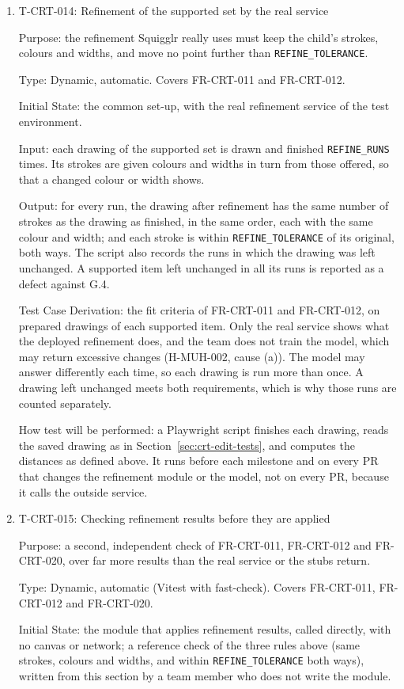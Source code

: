 \documentclass[12pt, titlepage]{article}
\newcommand{\testitem}[1]{\item #1\par\nopagebreak}
\begin{document}
\begin{enumerate}
\testitem{T-CRT-014: Refinement of the supported set by the real service}

Purpose: the refinement Squigglr really uses must keep the child's strokes,
colours and widths, and move no point further than \texttt{REFINE\_TOLERANCE}.

Type: Dynamic, automatic. Covers FR-CRT-011 and FR-CRT-012.

Initial State: the common set-up, with the real refinement service of the
test environment.

Input: each drawing of the supported set is drawn and finished
\texttt{REFINE\_RUNS} times. Its strokes are given colours and widths in turn
from those offered, so that a changed colour or width shows.

Output: for every run, the drawing after refinement has the same number of
strokes as the drawing as finished, in the same order, each with the same
colour and width; and each stroke is within \texttt{REFINE\_TOLERANCE} of
its original, both ways. The script also records the runs in which the
drawing was left unchanged. A supported item left unchanged in all its runs
is reported as a defect against G.4.

Test Case Derivation: the fit criteria of FR-CRT-011 and FR-CRT-012, on
prepared drawings of each supported item. Only the real service shows what
the deployed refinement does, and the team does not train the model, which
may return excessive changes (H-MUH-002, cause (a)). The model may answer
differently each time, so each drawing is run more than once. A drawing left
unchanged meets both requirements, which is why those runs are counted
separately.

How test will be performed: a Playwright script finishes each drawing, reads
the saved drawing as in Section~\ref{sec:crt-edit-tests}, and computes the
distances as defined above. It runs before each milestone and on every PR
that changes the refinement module or the model, not on every PR, because it
calls the outside service.

\testitem{T-CRT-015: Checking refinement results before they are applied}

Purpose: a second, independent check of FR-CRT-011, FR-CRT-012 and
FR-CRT-020, over far more results than the real service or the stubs return.

Type: Dynamic, automatic (Vitest with fast-check). Covers FR-CRT-011,
FR-CRT-012 and FR-CRT-020.

Initial State: the module that applies refinement results, called directly,
with no canvas or network; a reference check of the three rules above (same
strokes, colours and widths, and within \texttt{REFINE\_TOLERANCE} both
ways), written from this section by a team member who does not write the
module.


\end{enumerate}
\end{document}
